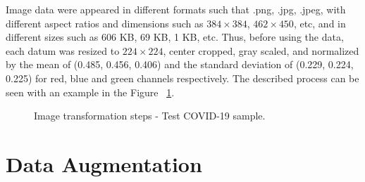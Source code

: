 Image data were appeared in different formats such that .png, .jpg, .jpeg, with different aspect ratios and dimensions such as $384 \times 384$, $462 \times 450$, etc, and in different sizes such as 606 KB, 69 KB, 1 KB, etc. Thus, before using the data, each datum was resized to $224 \times 224$, center cropped, gray scaled, and normalized by the mean of (0.485, 0.456, 0.406) and the standard deviation of (0.229, 0.224, 0.225) for red, blue and green channels respectively. The described process can be seen with an example in the Figure ~\ref{fig:data_transform_steps}. 

\begin{figure}[h]
	\centering
	\caption{Image transformation steps - Test COVID-19 sample.}
	\label{fig:data_transform_steps}
\end{figure}

\section{Data Augmentation}

